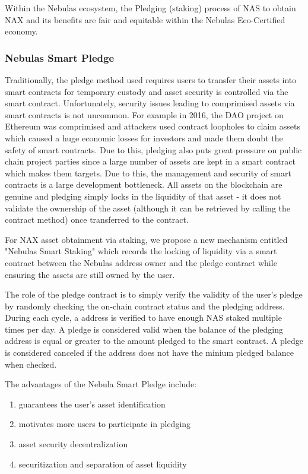 Within the Nebulas ecosystem, the Pledging (staking) process of NAS to obtain NAX and its benefits are fair and equitable within the Nebulas Eco-Certified economy.

\subsubsection{Nebulas Smart Pledge}
Traditionally, the pledge method used requires users to transfer their assets into smart contracts for temporary custody and asset security is controlled via the smart contract. Unfortunately, security issues leading to comprimised assets via smart contracts is not uncommon. For example in 2016, the DAO project on Ethereum was comprimised and attackers used contract loopholes to claim assets which caused a huge economic losses for investors and made them doubt the safety of smart contracts. Due to this, pledging also puts great pressure on public chain project parties since a large number of assets are kept in a smart contract which makes them targets. Due to this, the management and security of smart contracts is a large development bottleneck. All assets on the blockchain are genuine and pledging simply locks in the liquidity of that asset - it does not validate the ownership of the asset (although it can be retrieved by calling the contract method) once transferred to the contract.

For NAX asset obtainment via staking, we propose a new mechanism entitled "Nebulas Smart Staking" which records the locking of liquidity via a smart contract between the Nebulas address owner and the pledge contract while ensuring the assets are still owned by the user. 

The role of the pledge contract is to simply verify the validity of the user's pledge by randomly checking the on-chain contract status and the pledging address. During each cycle, a address is verified to have enough NAS staked multiple times per day. A pledge is considered valid when the balance of the pledging address is equal or greater to the amount pledged to the smart contract. A pledge is considered canceled if the address does not have the minium pledged balance when checked.

The advantages of the Nebula Smart Pledge include:
\begin{enumerate}[\hspace{2cm}(a)]
    \item guarantees the user's asset identification
    \item motivates more users to participate in pledging
    \item asset security decentralization
    \item securitization and separation of asset liquidity
\end{enumerate}

